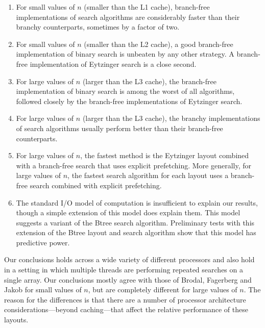 \documentclass{patmorin}
\begin{document}
\begin{enumerate}
  \item For small values of $n$ (smaller than the L1 cache), branch-free
    implementations of search algorithms are considerably faster than their
    branchy counterparts, sometimes by a factor of two.
  
  \item For small values of $n$ (smaller than the L2 cache), a good
    branch-free implementation of binary search is unbeaten by any other
    strategy.  A branch-free implementation of Eytzinger search is a
    close second.
  
  \item For large values of $n$ (larger than the L3 cache), the branch-free
    implementation of binary search is among the worst of all algorithms,
    followed closely by the branch-free implementations of Eytzinger
    search.
  
  \item For large values of $n$ (larger than the L3 cache), the branchy
    implementations of search algorithms usually perform better than their
    branch-free counterparts.

  \item For large values of $n$, the fastest method is the Eytzinger
   layout combined with a branch-free search that uses explicit
   prefetching.  More generally, for large values of $n$, the fastest
   search algorithm for each layout uses a branch-free search combined
   with explicit prefetching.

  \item The standard I/O model of computation \cite{aggarwal.vitter:input}
   is insufficient to explain our results, though a simple extension of
   this model does explain them.  This model suggests a variant of the
   Btree search algorithm. Preliminary tests with this extension
   of the Btree layout and search algorithm show that this model has
   predictive power.
\end{enumerate}

Our conclusions holds across a wide variety of different processors and
also hold in a setting in which multiple threads are performing repeated
searches on a single array.  Our conclusions mostly agree with those of
Brodal, Fagerberg and Jakob for small values of $n$, but are completely
different for large values of $n$.  The reason for the differences is
that there are a number of processor architecture considerations---beyond
caching---that affect the relative performance of these layouts.
\end{document}

